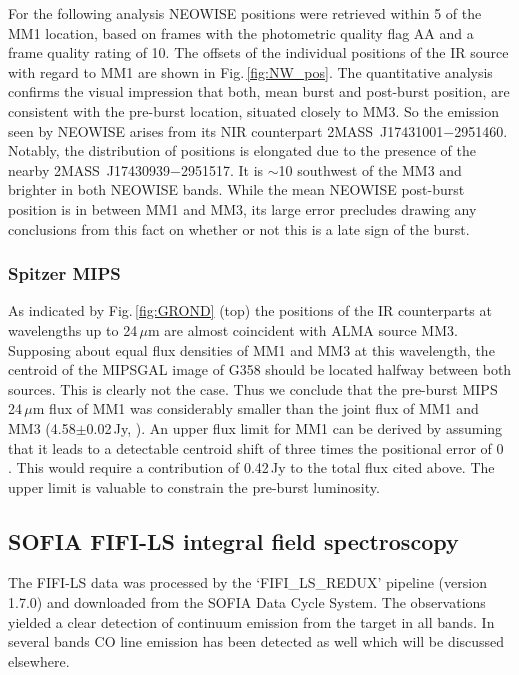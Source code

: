 \documentclass[longauth,usenatbib]{aa}
\begin{document}
For the following analysis NEOWISE positions were retrieved within 5\arcsec{} of the MM1 location, based on frames with the photometric quality flag AA and a frame quality rating of 10. The offsets of the individual positions of the IR source with regard to MM1 are shown in Fig.\,\ref{fig:NW_pos}. The quantitative analysis confirms the visual impression that both, mean burst and post-burst position, are consistent with the pre-burst location, situated closely to MM3. So the emission seen by NEOWISE arises from its NIR counterpart 2MASS~J17431001$-$2951460. Notably, the distribution of positions is elongated due to the presence of the nearby 2MASS~J17430939$-$2951517. It is ${\sim}$10\arcsec{} southwest of the MM3 and brighter in both NEOWISE bands.
While the mean NEOWISE post-burst position is in between MM1 and MM3, its large error precludes drawing any conclusions from this fact on whether or not this is a late sign of the burst.

\subsubsection{Spitzer MIPS}\label{mips}
As indicated by Fig.\,\ref{fig:GROND} (top) the positions of the IR counterparts at wavelengths up to 24\,$\mu$m are almost coincident with ALMA source MM3. Supposing about equal flux densities of MM1 and MM3 at this wavelength, the centroid of the MIPSGAL image of G358 should be located halfway between both sources. This is clearly not the case. Thus we conclude that the pre-burst MIPS 24\,$\mu$m flux of MM1 was considerably smaller than the joint flux of MM1 and MM3 (4.58$\pm$0.02\,Jy, ). An upper flux limit for MM1 can be derived by assuming that it leads to a detectable centroid shift of three times the positional error of 0 . This would require a contribution of 0.42\,Jy to the total flux cited above. The upper limit is valuable to constrain the pre-burst luminosity.

\subsection{SOFIA FIFI-LS integral field spectroscopy}\label{rfifi}
The FIFI-LS data was processed by the `FIFI\_LS\_REDUX' pipeline  (version 1.7.0) and downloaded from the SOFIA Data Cycle System. The observations yielded a clear detection of continuum emission from the target in all bands. In several bands CO line emission has been detected as well which will be discussed elsewhere. 
\end{document}
